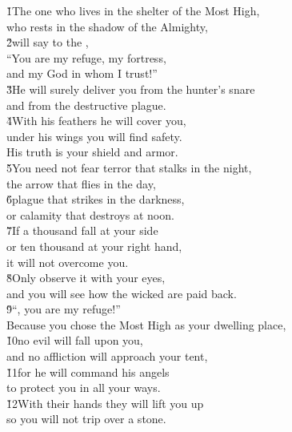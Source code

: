 \begin{poetry}
\poeml \v{1}The one who lives in the shelter of the Most High, \\
\poemll    who rests in the shadow of the Almighty, \\
\poeml \v{2}will say to the , \\
\poemll    ``You are my refuge, my fortress, \\
\poemlll       and my God in whom I trust!'' \\
\poeml \v{3}He will surely deliver you from the hunter's snare \\
\poemll    and from the destructive plague. \\
\poeml \v{4}With his feathers he will cover you, \\
\poemll    under his wings you will find safety. \\
\poemlll       His truth is your shield and armor. \\
\poeml \v{5}You need not fear terror that stalks in the night, \\
\poemll    the arrow that flies in the day, \\
\poeml \v{6}plague that strikes in the darkness, \\
\poemll    or calamity that destroys at noon. \\
\poeml \v{7}If a thousand fall at your side \\
\poemll    or ten thousand at your right hand, \\
\poemlll       it will not overcome you. \\
\poeml \v{8}Only observe it with your eyes, \\
\poemll    and you will see how the wicked are paid back. \\
\poeml \v{9}``, you are my refuge!'' \\
\poeml Because you chose the Most High as your dwelling place, \\
\poeml \v{10}no evil will fall upon you, \\
\poemlll       and no affliction will approach your tent, \\
\poeml \v{11}for he will command his angels \\
\poemll    to protect you in all your ways. \\
\poeml \v{12}With their hands they will lift you up \\
\poemll    so you will not trip over a stone. \\

\end{poetry}
